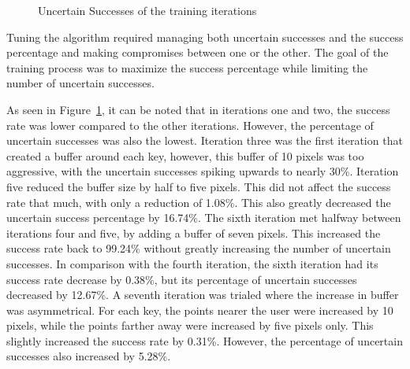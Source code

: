 \documentclass{report}
\begin{document}
\begin{figure}[H]
	\centering
	\caption{Uncertain Successes of the training iterations}
	\label{fig:rd-training-uncertain-successes-vs-success}
\end{figure}


Tuning the algorithm required managing both uncertain successes and the success
percentage and making compromises between one or the other. The goal of the
training process was to maximize the success percentage while limiting the
number of uncertain successes.

As seen in Figure~\ref{fig:rd-training-uncertain-successes-vs-success}, it can
be noted that in iterations one and two, the success rate was lower compared to
the other iterations. However, the percentage of uncertain successes was also
the lowest. Iteration three was the first iteration that created a buffer around
each key, however, this buffer of 10 pixels was too aggressive, with the
uncertain successes spiking upwards to nearly 30\%. Iteration five reduced the
buffer size by half to five pixels. This did not affect the success rate that
much, with only a reduction of 1.08\%. This also greatly decreased the uncertain
success percentage by 16.74\%. The sixth iteration met halfway between
iterations four and five, by adding a buffer of seven pixels. This increased the
success rate back to 99.24\% without greatly increasing the number of uncertain
successes. In comparison with the fourth iteration, the sixth iteration had its
success rate decrease by 0.38\%, but its percentage of uncertain successes
decreased by 12.67\%. A seventh iteration was trialed where the increase in
buffer was asymmetrical. For each key, the points nearer the user were increased
by 10 pixels, while the points farther away were increased by five pixels only.
This slightly increased the success rate by 0.31\%. However, the percentage of
uncertain successes also increased by 5.28\%.
\end{document}

